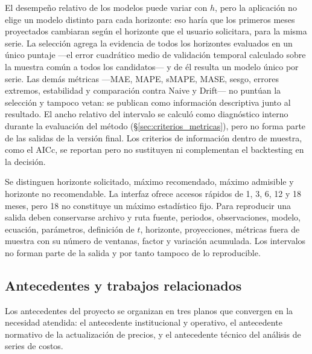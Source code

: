 \documentclass[12pt,letterpaper]{article}
\begin{document}
El desempeño relativo de los modelos puede variar con \(h\), pero la aplicación no elige un modelo distinto para cada horizonte: eso haría que los primeros meses proyectados cambiaran según el horizonte que el usuario solicitara, para la misma serie. La selección agrega la evidencia de todos los horizontes evaluados en un único puntaje ---el error cuadrático medio de validación temporal calculado sobre la muestra común a todos los candidatos--- y de él resulta un modelo único por serie. Las demás métricas ---MAE, MAPE, sMAPE, MASE, sesgo, errores extremos, estabilidad y comparación contra Naive y Drift--- no puntúan la selección y tampoco vetan: se publican como información descriptiva junto al resultado. El ancho relativo del intervalo se calculó como diagnóstico interno durante la evaluación del método (§\ref{sec:criterios_metricas}), pero no forma parte de las salidas de la versión final. Los criterios de información dentro de muestra, como el AICc, se reportan pero no sustituyen ni complementan el backtesting en la decisión.

Se distinguen horizonte solicitado, máximo recomendado, máximo admisible y horizonte no recomendable. La interfaz ofrece accesos rápidos de 1, 3, 6, 12 y 18 meses, pero 18 no constituye un máximo estadístico fijo. Para reproducir una salida deben conservarse archivo y ruta fuente, periodos, observaciones, modelo, ecuación, parámetros, definición de \(t\), horizonte, proyecciones, métricas fuera de muestra con su número de ventanas, factor y variación acumulada. Los intervalos no forman parte de la salida y por tanto tampoco de lo reproducible.

\subsection{Antecedentes y trabajos relacionados}

Los antecedentes del proyecto se organizan en tres planos que convergen en la necesidad atendida: el antecedente institucional y operativo, el antecedente normativo de la actualización de precios, y el antecedente técnico del análisis de series de costos.
\end{document}
